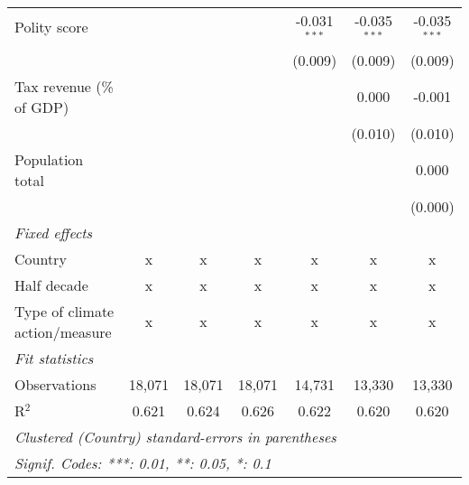 \begin{tabular}{lcccccc}
   Polity score                                                        &         &               &               & -0.031$^{***}$ & -0.035$^{***}$ & -0.035$^{***}$\\   
                                                                       &         &               &               & (0.009)        & (0.009)        & (0.009)\\   
   Tax revenue (\% of GDP)                                             &         &               &               &                & 0.000          & -0.001\\   
                                                                       &         &               &               &                & (0.010)        & (0.010)\\   
   Population total                                                    &         &               &               &                &                & 0.000\\   
                                                                       &         &               &               &                &                & (0.000)\\   
   \emph{Fixed effects}\\
   Country                                                             & x       & x             & x             & x              & x              & x\\  
   Half decade                                                         & x       & x             & x             & x              & x              & x\\  
   Type of climate action/measure                                      & x       & x             & x             & x              & x              & x\\  
   \midrule \emph{Fit statistics}\\
   Observations                                                        & 18,071  & 18,071        & 18,071        & 14,731         & 13,330         & 13,330\\  
   R$^2$                                                               & 0.621   & 0.624         & 0.626         & 0.622          & 0.620          & 0.620\\  
   \midrule
   \multicolumn{7}{l}{\emph{Clustered (Country) standard-errors in parentheses}}\\
   \multicolumn{7}{l}{\emph{Signif. Codes: ***: 0.01, **: 0.05, *: 0.1}}\\
\end{tabular}
\par\endgroup


